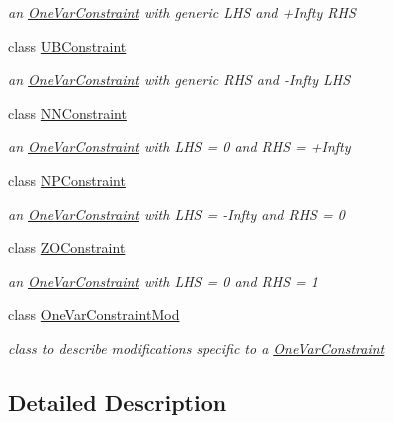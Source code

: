 \begin{DoxyCompactItemize}
\begin{DoxyCompactList}\small\item\em an \mbox{\hyperlink{class_s_m_spp__di__unipi__it_1_1_one_var_constraint}{One\+Var\+Constraint}} with generic L\+HS and +\+Infty R\+HS \end{DoxyCompactList}\item 
class \mbox{\hyperlink{class_s_m_spp__di__unipi__it_1_1_u_b_constraint}{U\+B\+Constraint}}
\begin{DoxyCompactList}\small\item\em an \mbox{\hyperlink{class_s_m_spp__di__unipi__it_1_1_one_var_constraint}{One\+Var\+Constraint}} with generic R\+HS and -\/\+Infty L\+HS \end{DoxyCompactList}\item 
class \mbox{\hyperlink{class_s_m_spp__di__unipi__it_1_1_n_n_constraint}{N\+N\+Constraint}}
\begin{DoxyCompactList}\small\item\em an \mbox{\hyperlink{class_s_m_spp__di__unipi__it_1_1_one_var_constraint}{One\+Var\+Constraint}} with L\+HS = 0 and R\+HS = +\+Infty \end{DoxyCompactList}\item 
class \mbox{\hyperlink{class_s_m_spp__di__unipi__it_1_1_n_p_constraint}{N\+P\+Constraint}}
\begin{DoxyCompactList}\small\item\em an \mbox{\hyperlink{class_s_m_spp__di__unipi__it_1_1_one_var_constraint}{One\+Var\+Constraint}} with L\+HS = -\/\+Infty and R\+HS = 0 \end{DoxyCompactList}\item 
class \mbox{\hyperlink{class_s_m_spp__di__unipi__it_1_1_z_o_constraint}{Z\+O\+Constraint}}
\begin{DoxyCompactList}\small\item\em an \mbox{\hyperlink{class_s_m_spp__di__unipi__it_1_1_one_var_constraint}{One\+Var\+Constraint}} with L\+HS = 0 and R\+HS = 1 \end{DoxyCompactList}\item 
class \mbox{\hyperlink{class_s_m_spp__di__unipi__it_1_1_one_var_constraint_mod}{One\+Var\+Constraint\+Mod}}
\begin{DoxyCompactList}\small\item\em class to describe modifications specific to a \mbox{\hyperlink{class_s_m_spp__di__unipi__it_1_1_one_var_constraint}{One\+Var\+Constraint}} \end{DoxyCompactList}\end{DoxyCompactItemize}


\subsection{Detailed Description}
